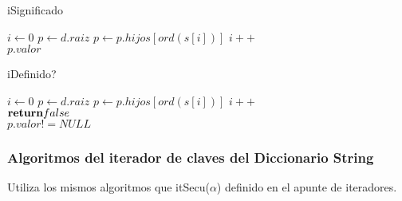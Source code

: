 \begin{algorithm}
\caption{iSignificado}
\label{in diccString(alfa): d, in string: c -> res = alfa}
\begin{algorithmic}
\State $i \gets 0$
\State $p \gets d.raiz$
\State $p \gets p.hijos[ord(s[i])]$
\State $i++$
\EndWhile\\
\Return $p.valor$
\end{algorithmic}
\end{algorithm}

\begin{algorithm}
\caption{iDefinido?}
\label{in diccString: d, in string: c -> res = bool}
\begin{algorithmic}
\State $i \gets 0$
\State $p \gets d.raiz$
\State $p \gets p.hijos[ord(s[i])]$
\State $i++$
\Else \\{$\Return false$}
\EndIf
\EndWhile\\
\Return $p.valor != NULL$
\end{algorithmic}
\end{algorithm}


\begin{comment}
\begin{algorithm}
\caption{iClaves}
\label{in diccString: d -> res = lista_enlazada(string)}
\begin{algorithmic}
\Return itClaves(d)
\end{algorithmic}
\end{algorithm}
\end{comment}

\subsubsection{Algoritmos del iterador de claves del Diccionario String}

Utiliza los mismos algoritmos que itSecu($\alpha$) definido en el apunte de iteradores.

